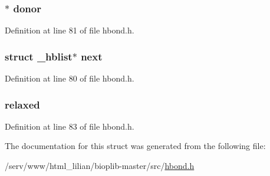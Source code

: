 \hypertarget{struct__hblist_a4dba8777f299b21706d939ca2536b49e}{
\subsubsection[{donor}]{$\ast$ donor}}\label{struct__hblist_a4dba8777f299b21706d939ca2536b49e}


Definition at line 81 of file hbond.\-h.

\hypertarget{struct__hblist_a5fbc92c76707b2e557684747d57f182c}{
\subsubsection[{next}]{\setlength{\rightskip}{0pt plus 5cm}struct {\bf \-\_\-hblist}$\ast$ next}}\label{struct__hblist_a5fbc92c76707b2e557684747d57f182c}


Definition at line 80 of file hbond.\-h.

\hypertarget{struct__hblist_ac28045b9df01d624f6333f21453287ae}{
\subsubsection[{relaxed}]{ relaxed}}\label{struct__hblist_ac28045b9df01d624f6333f21453287ae}


Definition at line 83 of file hbond.\-h.



The documentation for this struct was generated from the following file\-:\begin{DoxyCompactItemize}
\item 
/serv/www/html\-\_\-lilian/bioplib-\/master/src/\hyperlink{hbond_8h}{hbond.\-h}\end{DoxyCompactItemize}
